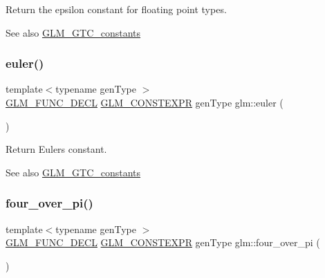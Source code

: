 Return the epsilon constant for floating point types. \begin{DoxySeeAlso}{See also}
\hyperlink{group__gtc__constants}{G\+L\+M\+\_\+\+G\+T\+C\+\_\+constants} 
\end{DoxySeeAlso}
\mbox{\label{group__gtc__constants_gad8fe2e6f90bce9d829e9723b649fbd42}} 
\subsubsection{\texorpdfstring{euler()}{euler()}}
{\footnotesize\ttfamily template$<$typename gen\+Type $>$ \\
\hyperlink{setup_8hpp_ab2d052de21a70539923e9bcbf6e83a51}{G\+L\+M\+\_\+\+F\+U\+N\+C\+\_\+\+D\+E\+CL} \hyperlink{setup_8hpp_a08b807947b47031d3a511f03f89645ad}{G\+L\+M\+\_\+\+C\+O\+N\+S\+T\+E\+X\+PR} gen\+Type glm\+::euler (\begin{DoxyParamCaption}{ }\end{DoxyParamCaption})}

Return Euler\textquotesingle{}s constant. \begin{DoxySeeAlso}{See also}
\hyperlink{group__gtc__constants}{G\+L\+M\+\_\+\+G\+T\+C\+\_\+constants} 
\end{DoxySeeAlso}
\mbox{\label{group__gtc__constants_ga753950e5140e4ea6a88e4a18ba61dc09}} 
\subsubsection{\texorpdfstring{four\+\_\+over\+\_\+pi()}{four\_over\_pi()}}
{\footnotesize\ttfamily template$<$typename gen\+Type $>$ \\
\hyperlink{setup_8hpp_ab2d052de21a70539923e9bcbf6e83a51}{G\+L\+M\+\_\+\+F\+U\+N\+C\+\_\+\+D\+E\+CL} \hyperlink{setup_8hpp_a08b807947b47031d3a511f03f89645ad}{G\+L\+M\+\_\+\+C\+O\+N\+S\+T\+E\+X\+PR} gen\+Type glm\+::four\+\_\+over\+\_\+pi (\begin{DoxyParamCaption}{ }\end{DoxyParamCaption})}

